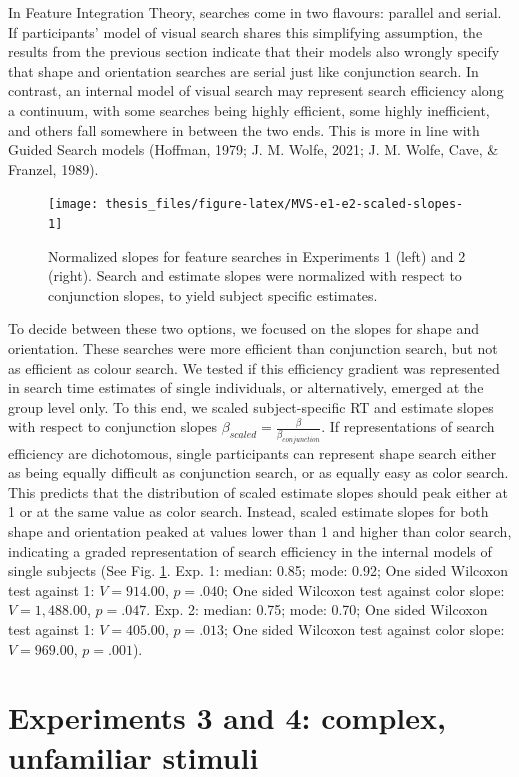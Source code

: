 \documentclass[12pt,twoside]{reedthesis}
\begin{document}
In Feature Integration Theory, searches come in two flavours: parallel and serial. If participants' model of visual search shares this simplifying assumption, the results from the previous section indicate that their models also wrongly specify that shape and orientation searches are serial just like conjunction search. In contrast, an internal model of visual search may represent search efficiency along a continuum, with some searches being highly efficient, some highly inefficient, and others fall somewhere in between the two ends. This is more in line with Guided Search models (Hoffman, 1979; J. M. Wolfe, 2021; J. M. Wolfe, Cave, \& Franzel, 1989).
\begin{figure}
\texttt{[image: thesis\_files/figure-latex/MVS-e1-e2-scaled-slopes-1]} \caption[Normalized slopes, Experiments 1 and 2]{Normalized slopes for feature searches in Experiments 1 (left) and 2 (right). Search and estimate slopes were normalized with respect to conjunction slopes, to yield subject specific estimates.}\label{fig:MVS-e1-e2-scaled-slopes}
\end{figure}
To decide between these two options, we focused on the slopes for shape and orientation. These searches were more efficient than conjunction search, but not as efficient as colour search. We tested if this efficiency gradient was represented in search time estimates of single individuals, or alternatively, emerged at the group level only. To this end, we scaled subject-specific RT and estimate slopes with respect to conjunction slopes \(\beta_{scaled}=\frac{\beta}{\beta_{conjunction}}\). If representations of search efficiency are dichotomous, single participants can represent shape search either as being equally difficult as conjunction search, or as equally easy as color search. This predicts that the distribution of scaled estimate slopes should peak either at 1 or at the same value as color search. Instead, scaled estimate slopes for both shape and orientation peaked at values lower than 1 and higher than color search, indicating a graded representation of search efficiency in the internal models of single subjects (See Fig. \ref{fig:MVS-e1-e2-scaled-slopes}. Exp. 1: median: 0.85; mode: 0.92; One sided Wilcoxon test against 1: \(V = 914.00\), \(p = .040\); One sided Wilcoxon test against color slope: \(V = 1,488.00\), \(p = .047\). Exp. 2: median: 0.75; mode: 0.70; One sided Wilcoxon test against 1: \(V = 405.00\), \(p = .013\); One sided Wilcoxon test against color slope: \(V = 969.00\), \(p = .001\)).

\hypertarget{experiments-3-and-4-complex-unfamiliar-stimuli}{%
\section{Experiments 3 and 4: complex, unfamiliar stimuli}\label{experiments-3-and-4-complex-unfamiliar-stimuli}}
\end{document}
